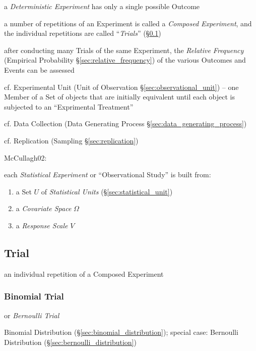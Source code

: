 a \emph{Deterministic Experiment} has only a single possible Outcome

a number of repetitions of an Experiment is called a \emph{Composed Experiment},
and the individual repetitions are called ``\emph{Trials}'' (\S\ref{sec:trial})

after conducting many Trials of the same Experiment, the \emph{Relative
  Frequency} (Empirical Probability \S\ref{sec:relative_frequency}) of the
various Outcomes and Events can be assessed

\fist cf. Experimental Unit (Unit of Observation \S\ref{sec:observational_unit})
-- one Member of a Set of objects that are initially equivalent until each
object is subjected to an ``Exprimental Treatment''

\fist cf. Data Collection (Data Generating Process
\S\ref{sec:data_generating_process})

\fist cf. Replication (Sampling \S\ref{sec:replication})

\asterism


McCullagh02:

each \emph{Statistical Experiment} or ``Observational Study'' is built from:
\begin{enumerate}
  \item a Set $U$ of \emph{Statistical Units} (\S\ref{sec:statistical_unit})
  \item a \emph{Covariate Space} $\Omega$
  \item a \emph{Response Scale} $V$
\end{enumerate}



\subsection{Trial}\label{sec:trial}

an individual repetition of a Composed Experiment



\subsubsection{Binomial Trial}\label{sec:binomial_trial}

or \emph{Bernoulli Trial}

Binomial Distribution (\S\ref{sec:binomial_distribution}); special case:
Bernoulli Distribution (\S\ref{sec:bernoulli_distribution})

